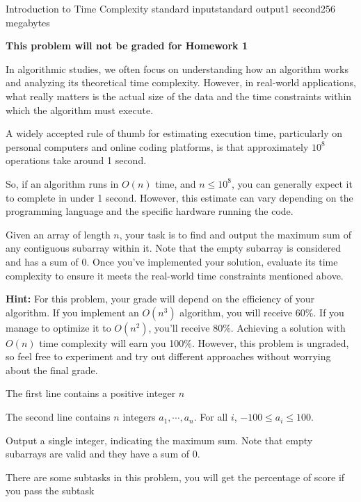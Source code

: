 \begin{problem}{Introduction to Time Complexity }{standard input}{standard output}{1 second}{256 megabytes}

\textbf{This problem will not be graded for Homework 1} 

In algorithmic studies, we often focus on understanding how an algorithm works and analyzing its theoretical time complexity. However, in real-world applications, what really matters is the actual size of the data and the time constraints within which the algorithm must execute.

A widely accepted rule of thumb for estimating execution time, particularly on personal computers and online coding platforms, is that approximately $10^8$ operations take around 1 second.

So, if an algorithm runs in $O(n)$ time, and $n \le 10^8$, you can generally expect it to complete in under 1 second. However, this estimate can vary depending on the programming language and the specific hardware running the code.

Given an array of length $n$, your task is to find and output the maximum sum of any contiguous subarray within it. Note that the empty subarray is considered and has a sum of 0. Once you've implemented your solution, evaluate its time complexity to ensure it meets the real-world time constraints mentioned above.

\textbf{Hint: } For this problem, your grade will depend on the efficiency of your algorithm. If you implement an $O(n^3)$ algorithm, you will receive 60\%. If you manage to optimize it to $O(n^2)$, you'll receive 80\%. Achieving a solution with $O(n)$ time complexity will earn you 100\%. However, this problem is ungraded, so feel free to experiment and try out different approaches without worrying about the final grade.


\InputFile
The first line contains a positive integer $n$

The second line contains $n$ integers $a_1, \cdots, a_n$. For all $i$, $-100 \leq a_i \leq 100$.

\OutputFile
Output a single integer, indicating the maximum sum. Note that empty subarrays are valid and they have a sum of 0.

\Scoring
There are some subtasks in this problem, you will get the percentage of score if you pass the subtask


\end{problem}
